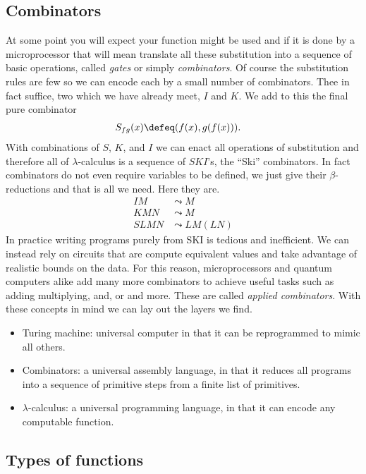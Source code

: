 \subsection{Combinators}
At some point you will expect your function might be used and if it is done 
by a microprocessor that will mean translate all these substitution into a 
sequence of basic operations, called \emph{gates} or simply \emph{combinators}.
Of course the substitution rules are few so we can encode each by a small 
number of combinators.  Thee in fact suffice, two which we have already meet, 
$I$ and $K$.  We add to this the final pure combinator 
\begin{align*}
    S_{fg}(x) & \defeq (f(x),g(f(x))).
\end{align*}
With combinations of $S$, $K$, and $I$ we can enact all operations of substitution
and therefore all of $\lambda$-calculus is a sequence of $SKI$'s, the ``Ski'' combinators.
In fact combinators do not even require variables to be defined, we just give their 
$\beta$-reductions and that is all we need.  Here they are.
\begin{align*}
    IM & \leadsto M\\
    KMN & \leadsto M\\
    SLMN & \leadsto LM(LN)
\end{align*}
In practice writing programs purely from SKI is tedious and inefficient.  We can 
instead rely on circuits that are compute equivalent values and take advantage 
of realistic bounds on the data.  For this reason, microprocessors and 
quantum computers alike add many more combinators to achieve useful tasks 
such as adding multiplying, and, or and more.  These are called \emph{applied combinators}.
With these concepts in mind we can lay out the layers we find.

\begin{itemize}
    \item Turing machine: universal computer in that it can be reprogrammed to 
    mimic all others.

    \item Combinators: a universal assembly language, in that it reduces all 
    programs into a sequence of primitive steps from a finite list of primitives.

    \item $\lambda$-calculus: a universal programming language, in that it can 
    encode any computable function.

\end{itemize}

\subsection{Types of functions}
